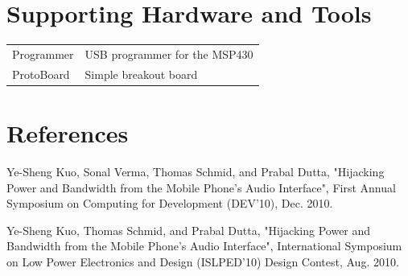 \documentclass[10pt,letterpaper]{datasheet}
\begin{document}
\begin{multicols}{2}
\section*{Supporting Hardware and Tools}

\begin{tabular}{p{1.05in} l}
Programmer       & USB programmer for the MSP430\\
ProtoBoard       & Simple breakout board\\
\end{tabular}


\section*{References}

Ye-Sheng Kuo, Sonal Verma, Thomas Schmid, and Prabal Dutta, "Hijacking Power and Bandwidth from the Mobile Phone's Audio Interface", First Annual Symposium on Computing for Development (DEV'10), Dec. 2010. 

Ye-Sheng Kuo, Thomas Schmid, and Prabal Dutta, "Hijacking Power and Bandwidth from the Mobile Phone's Audio Interface", International Symposium on Low Power Electronics and Design (ISLPED'10) Design Contest, Aug. 2010. 



\end{multicols}
\end{document}

